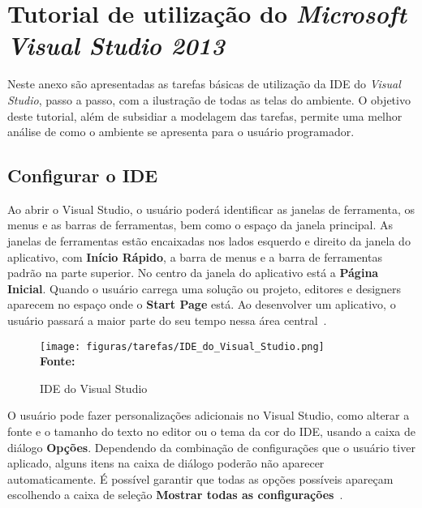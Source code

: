 \chapter{Tutorial de utilização do \textit{Microsoft Visual Studio 2013}}\label{tutorial}


Neste anexo são apresentadas as tarefas básicas de utilização da IDE do \textit{Visual Studio}, passo a passo, com a ilustração de todas as telas do ambiente. O objetivo deste tutorial, além de subsidiar a modelagem das tarefas, permite uma melhor análise de como o ambiente se apresenta para o usuário programador.


\section{Configurar o IDE}

Ao abrir o Visual Studio, o usuário poderá identificar as janelas de ferramenta, os menus e as barras de ferramentas, bem como o espaço da janela principal. As janelas de ferramentas estão encaixadas nos lados esquerdo e direito da janela do aplicativo, com \textbf{Início Rápido}, a barra de menus e a barra de ferramentas padrão na parte superior. No centro da janela do aplicativo está a \textbf{Página Inicial}. Quando o usuário carrega uma solução ou projeto, editores e designers aparecem no espaço onde o \textbf{Start Page} está. Ao desenvolver um aplicativo, o usuário passará a maior parte do seu tempo nessa área central~\cite {tutorial_visual:14}. 

\begin{figure}[ht!]
	\centering	
	\caption[\hspace{-0.1cm}IDE do Visual Studio]{IDE do Visual Studio}
	\vspace{-0.4cm}
	\texttt{[image: figuras/tarefas/IDE\_do\_Visual\_Studio.png]}
	\vspace{-0.2cm}
	\\\textbf{\footnotesize Fonte:~\cite {tutorial_visual:14} }
	\label{fig:IDE_do_Visual_Studio}
	\vspace{-0.5cm}
\end{figure}


O usuário pode fazer personalizações adicionais no Visual Studio, como alterar a fonte e o tamanho do texto no editor ou o tema da cor do IDE, usando a caixa de diálogo \textbf{Opções}. Dependendo da combinação de configurações que o usuário tiver aplicado, alguns itens na caixa de diálogo poderão não aparecer automaticamente. É possível garantir que todas as opções possíveis apareçam escolhendo a caixa de seleção \textbf{Mostrar todas as configurações}~\cite {tutorial_visual:14}. 


